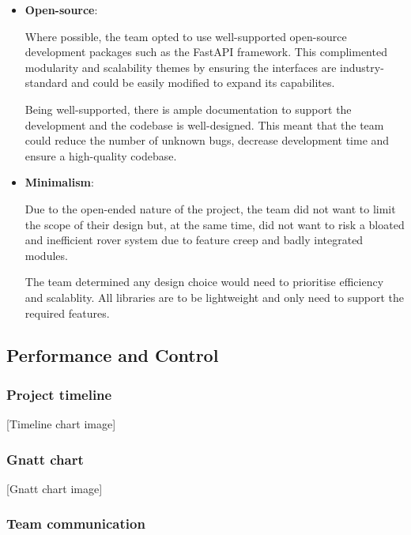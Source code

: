 \documentclass[11pt, a4paper]{article}
\begin{document}
\begin{itemize}
    \item \textbf{Open-source}: 
    
    Where possible, the team opted to use well-supported open-source development packages such as the FastAPI framework. This complimented modularity and scalability themes by ensuring the interfaces are industry-standard and could be easily modified to expand its capabilites. 
    
    Being well-supported, there is ample documentation to support the development and the codebase is well-designed. This meant that the team could reduce the number of unknown bugs, decrease development time and ensure a high-quality codebase.     

    \item \textbf{Minimalism}:
    
    Due to the open-ended nature of the project, the team did not want to limit the scope of their design but, at the same time, did not want to risk a bloated and inefficient rover system due to feature creep and badly integrated modules. 
    
    The team determined any design choice would need to prioritise efficiency and scalablity. All libraries are to be lightweight and only need to support the required features. 
    
\end{itemize}

\vfill

\pagebreak
\subsection{Performance and Control}

\subsubsection{Project timeline}

\begin{center}
    [Timeline chart image]
\end{center}


\subsubsection{Gnatt chart}

\begin{center}
    [Gnatt chart image]
\end{center}


\subsubsection{Team communication}
\end{document}
